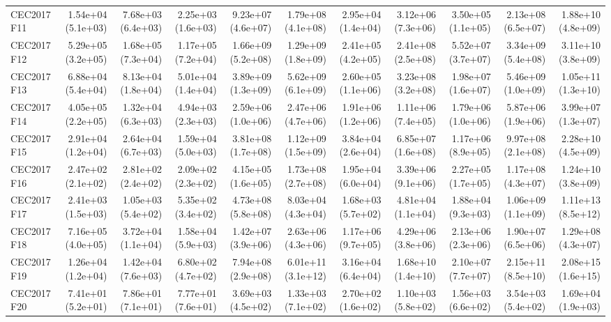 \begin{longtable}{lrrrrrrrrrr}
CEC2017 F11 & 1.54e+04 (5.1e+03) & 7.68e+03 (6.4e+03) & 2.25e+03 (1.6e+03) & 9.23e+07 (4.6e+07) & 1.79e+08 (4.1e+08) & 2.95e+04 (1.4e+04) & 3.12e+06 (7.3e+06) & 3.50e+05 (1.1e+05) & 2.13e+08 (6.5e+07) & 1.88e+10 (4.8e+09) \\
CEC2017 F12 & 5.29e+05 (3.2e+05) & 1.68e+05 (7.3e+04) & 1.17e+05 (7.2e+04) & 1.66e+09 (5.2e+08) & 1.29e+09 (1.8e+09) & 2.41e+05 (4.2e+05) & 2.41e+08 (2.5e+08) & 5.52e+07 (3.7e+07) & 3.34e+09 (5.4e+08) & 3.11e+10 (3.8e+09) \\
CEC2017 F13 & 6.88e+04 (5.4e+04) & 8.13e+04 (1.8e+04) & 5.01e+04 (1.4e+04) & 3.89e+09 (1.3e+09) & 5.62e+09 (6.1e+09) & 2.60e+05 (1.1e+06) & 3.23e+08 (3.2e+08) & 1.98e+07 (1.6e+07) & 5.46e+09 (1.0e+09) & 1.05e+11 (1.3e+10) \\
CEC2017 F14 & 4.05e+05 (2.2e+05) & 1.32e+04 (6.3e+03) & 4.94e+03 (2.3e+03) & 2.59e+06 (1.0e+06) & 2.47e+06 (4.7e+06) & 1.91e+06 (1.2e+06) & 1.11e+06 (7.4e+05) & 1.79e+06 (1.0e+06) & 5.87e+06 (1.9e+06) & 3.99e+07 (1.3e+07) \\
CEC2017 F15 & 2.91e+04 (1.2e+04) & 2.64e+04 (6.7e+03) & 1.59e+04 (5.0e+03) & 3.81e+08 (1.7e+08) & 1.12e+09 (1.5e+09) & 3.84e+04 (2.6e+04) & 6.85e+07 (1.6e+08) & 1.17e+06 (8.9e+05) & 9.97e+08 (2.1e+08) & 2.28e+10 (4.5e+09) \\
CEC2017 F16 & 2.47e+02 (2.1e+02) & 2.81e+02 (2.4e+02) & 2.09e+02 (2.3e+02) & 4.15e+05 (1.6e+05) & 1.73e+08 (2.7e+08) & 1.95e+04 (6.0e+04) & 3.39e+06 (9.1e+06) & 2.27e+05 (1.7e+05) & 1.17e+08 (4.3e+07) & 1.24e+10 (3.8e+09) \\
CEC2017 F17 & 2.41e+03 (1.5e+03) & 1.05e+03 (5.4e+02) & 5.35e+02 (3.4e+02) & 4.73e+08 (5.8e+08) & 8.03e+04 (4.3e+04) & 1.68e+03 (5.7e+02) & 4.81e+04 (1.1e+04) & 1.88e+04 (9.3e+03) & 1.06e+09 (1.1e+09) & 1.11e+13 (8.5e+12) \\
CEC2017 F18 & 7.16e+05 (4.0e+05) & 3.72e+04 (1.1e+04) & 1.58e+04 (5.9e+03) & 1.42e+07 (3.9e+06) & 2.63e+06 (4.3e+06) & 1.17e+06 (9.7e+05) & 4.29e+06 (3.8e+06) & 2.13e+06 (2.3e+06) & 1.90e+07 (6.5e+06) & 1.29e+08 (4.3e+07) \\
CEC2017 F19 & 1.26e+04 (1.2e+04) & 1.42e+04 (7.6e+03) & 6.80e+02 (4.7e+02) & 7.94e+08 (2.9e+08) & 6.01e+11 (3.1e+12) & 3.16e+04 (6.4e+04) & 1.68e+10 (1.4e+10) & 2.10e+07 (7.7e+07) & 2.15e+11 (8.5e+10) & 2.08e+15 (1.6e+15) \\
CEC2017 F20 & 7.41e+01 (5.2e+01) & 7.86e+01 (7.1e+01) & 7.77e+01 (7.6e+01) & 3.69e+03 (4.5e+02) & 1.33e+03 (7.1e+02) & 2.70e+02 (1.6e+02) & 1.10e+03 (5.8e+02) & 1.56e+03 (6.6e+02) & 3.54e+03 (5.4e+02) & 1.69e+04 (1.9e+03) \\

\end{longtable}
